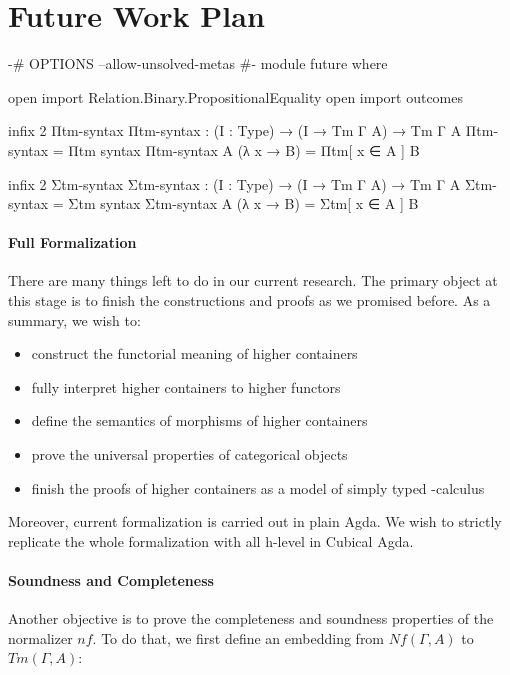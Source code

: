 \chapter{Future Work Plan}

\begin{code}[hide]
{-# OPTIONS --allow-unsolved-metas #-}
module future where

open import Relation.Binary.PropositionalEquality
open import outcomes

infix 2 Πtm-syntax
Πtm-syntax : (I : Type) → (I → Tm Γ A) → Tm Γ A
Πtm-syntax = Πtm
syntax Πtm-syntax A (λ x → B) = Πtm[ x ∈ A ] B

infix 2 Σtm-syntax
Σtm-syntax : (I : Type) → (I → Tm Γ A) → Tm Γ A
Σtm-syntax = Σtm
syntax Σtm-syntax A (λ x → B) = Σtm[ x ∈ A ] B
\end{code}

\subsubsection*{Full Formalization}

There are many things left to do in our current research. The primary object at this stage is to finish the constructions and proofs as we promised before. As a summary, we wish to:

\begin{itemize}
  \item{construct the functorial meaning of higher containers}
  \item{fully interpret higher containers to higher functors}
  \item{define the semantics of morphisms of higher containers}
  \item{prove the universal properties of categorical objects}
  \item{finish the proofs of higher containers as a model of simply typed \lambda-calculus}
\end{itemize}

Moreover, current formalization is carried out in plain Agda. We wish to strictly replicate the whole formalization with all h-level in Cubical Agda.

\subsubsection*{Soundness and Completeness}

Another objective is to prove the completeness and soundness properties of the normalizer $nf$. To do that, we first define an embedding from $Nf(\Gamma,A)$ to $Tm(\Gamma,A)$:

